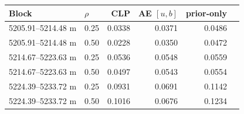 \begin{tabular}{llrrrr}
\toprule
Block & $\rho$ & CLP & AE $[u,b]$ & prior-only \\
\midrule
5205.91--5214.48 m & 0.25 & 0.0338 & 0.0371 & 0.0486 \\
5205.91--5214.48 m & 0.50 & 0.0228 & 0.0350 & 0.0472 \\
5214.67--5223.63 m & 0.25 & 0.0536 & 0.0548 & 0.0559 \\
5214.67--5223.63 m & 0.50 & 0.0497 & 0.0543 & 0.0554 \\
5224.39--5233.72 m & 0.25 & 0.0931 & 0.0691 & 0.1142 \\
5224.39--5233.72 m & 0.50 & 0.1016 & 0.0676 & 0.1234 \\
\bottomrule
\end{tabular}
